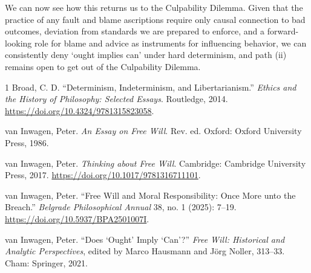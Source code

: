 We can now see how this returns us to the Culpability Dilemma. Given
that the practice of any fault and blame ascriptions require only causal
connection to bad outcomes, deviation from standards we are prepared to
enforce, and a forward-looking role for blame and advice as instruments
for influencing behavior, we can consistently deny `ought implies can'
under hard determinism, and path (ii) remains open to get out of the
Culpability Dilemma.


\begin{hangparas}{\hangingindent}{1}
Broad, C. D. ``Determinism, Indeterminism, and Libertarianism.''
\emph{Ethics and the History of Philosophy: Selected Essays}. Routledge,
2014. 
\url{https://doi.org/10.4324/9781315823058}.

van Inwagen, Peter.
\emph{An Essay on Free Will}. Rev. ed. Oxford: Oxford University Press,
1986.

van Inwagen, Peter. \emph{Thinking about Free Will}. Cambridge:
Cambridge University Press, 2017.
\url{https://doi.org/10.1017/9781316711101}.

van Inwagen, Peter. ``Free Will and Moral Responsibility: Once More unto
the Breach.'' \emph{Belgrade Philosophical Annual} 38, no. 1 (2025):
7--19.
\url{https://doi.org/10.5937/BPA2501007I}.

van Inwagen, Peter. ``Does `Ought' Imply `Can'?'' \emph{Free Will:
Historical and Analytic Perspectives}, edited by Marco Hausmann and Jörg
Noller, 313--33. Cham: Springer, 2021.
\end{hangparas}